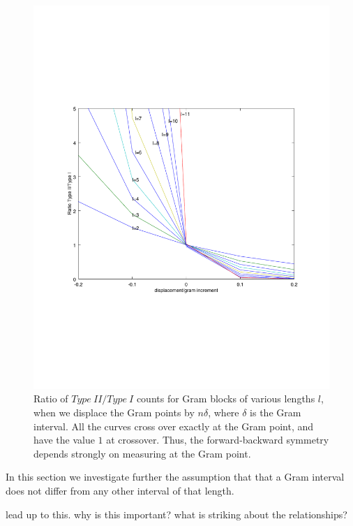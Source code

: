 \documentclass[twoside]{article}
\begin{document}
\begin{figure}
\centering
\includegraphics[width=1.1\textwidth]{typeIIratio}
\caption[]{ 
  Ratio of $Type~II/Type~I$ counts for Gram blocks of various lengths $l$, when we displace the Gram points by $n\delta$, where $\delta$ is the Gram interval. All the curves cross over exactly at the Gram point, and have the value $1$ at crossover. Thus, the forward-backward symmetry depends strongly on measuring at the Gram point.
 }
\vspace{1mm}
\label{typeIIratio}
\end{figure}


In this section we investigate further the assumption that that a Gram interval does not differ from any other interval of that length. 

lead up to this. why is this important? what is striking about the relationships?
\end{document}
